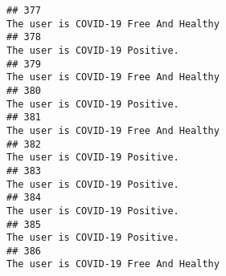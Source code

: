 \documentclass[
]{article}
\begin{document}
\begin{verbatim}
## 377                                                                                                                                                                                                                              The user is COVID-19 Free And Healthy
## 378                                                                                                                                                                                                                                     The user is COVID-19 Positive.
## 379                                                                                                                                                                                                                              The user is COVID-19 Free And Healthy
## 380                                                                                                                                                                                                                                     The user is COVID-19 Positive.
## 381                                                                                                                                                                                                                              The user is COVID-19 Free And Healthy
## 382                                                                                                                                                                                                                                     The user is COVID-19 Positive.
## 383                                                                                                                                                                                                                                     The user is COVID-19 Positive.
## 384                                                                                                                                                                                                                                     The user is COVID-19 Positive.
## 385                                                                                                                                                                                                                                     The user is COVID-19 Positive.
## 386                                                                                                                                                                                                                              The user is COVID-19 Free And Healthy

\end{verbatim}
\end{document}
